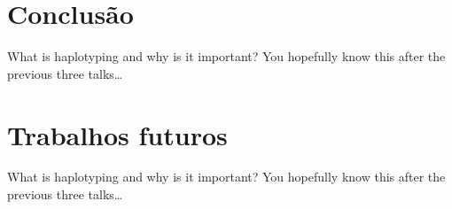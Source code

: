\documentclass[brazil]{beamer}
\begin{document}
\section{Conclusão}

\begin{frame}{What is haplotyping and why is it important?}
  You hopefully know this after the previous three talks\dots
\end{frame}

\section{Trabalhos futuros}

\begin{frame}{What is haplotyping and why is it important?}
  You hopefully know this after the previous three talks\dots
\end{frame}

\end{document}

